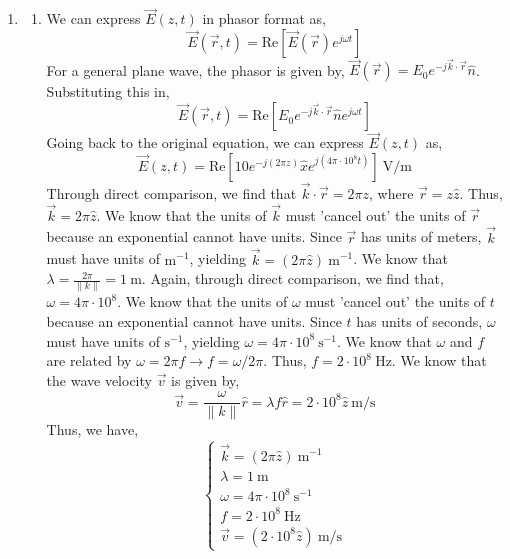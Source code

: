 \documentclass[12pt]{article}
\begin{document}
\begin{enumerate}
	\item [5.2]
	\begin{enumerate}
		\item [a.]
		We can express $\vec E(z,t)$ in phasor format as,
		\[\vec E(\vec r,t)=\mathrm{Re}\left[\vec E(\vec r)e^{j\omega t}\right]\]
		For a general plane wave, the phasor is given by, $\vec E(\vec r)=E_0e^{-j\vec k \cdot \vec r}\hat n$.
		Substituting this in,
		\[\vec E(\vec r, t)=\mathrm{Re}\left[E_0e^{-j\vec k \cdot \vec r}\hat n e^{j\omega t}\right]\]
		Going back to the original equation, we can express $\vec E(z,t)$ as,
		\[\vec E(z,t)=\mathrm{Re}\left[10e^{-j(2\pi z)}\hat x e^{j(4\pi \cdot 10^8t)}\right]\:\mathrm{V/m}\]
		Through direct comparison, we find that $\vec k \cdot \vec r = 2\pi z$, where $\vec r = z\hat z$.
		Thus, $\vec k = 2\pi \hat z$.
		We know that the units of $\vec k$ must 'cancel out' the units of $\vec r$ because an exponential cannot have units.
		Since $\vec r$ has units of meters, $\vec k$ must have units of $\mathrm{m}^{-1}$, yielding $\vec k = (2\pi \hat z)\: \mathrm{m}^{-1}$.
		We know that $\lambda = \frac{2\pi}{\|k\|}=1 \: \mathrm{m}$.
		Again, through direct comparison, we find that, $\omega = 4\pi \cdot 10^8$.
		We know that the units of $\omega$ must 'cancel out' the units of $t$ because an exponential cannot have units.
		Since $t$ has units of seconds, $\omega$ must have units of $\mathrm{s}^{-1}$, yielding $\omega = 4\pi\cdot 10^8 \: \mathrm{s^{-1}}$.
		We know that $\omega$ and $f$ are related by $\omega = 2\pi f \to f = \omega/2\pi$.
		Thus, $f=2 \cdot 10^8 \: \mathrm{Hz}$.
		We know that the wave velocity $\vec v$ is given by,
		\[\vec v= \frac{\omega}{\|k\|}\hat r = \lambda f \hat r = 2\cdot 10^8 \hat z \: \mathrm{m/s}\]
		Thus, we have,
		\[\boxed{\begin{cases}
			\vec k = (2\pi \hat z)\: \mathrm{m^{-1}} \\ 
			\lambda = 1\: \mathrm{m} \\ 
			\omega = 4\pi \cdot 10^8 \: \mathrm{s^{-1}} \\ 
			f = 2 \cdot 10^8 \: \mathrm{Hz} \\ 
			\vec v= (2\cdot 10^8 \hat z)\: \mathrm{m/s}
		\end{cases}}\]


\end{enumerate}
\end{enumerate}
\end{document}
